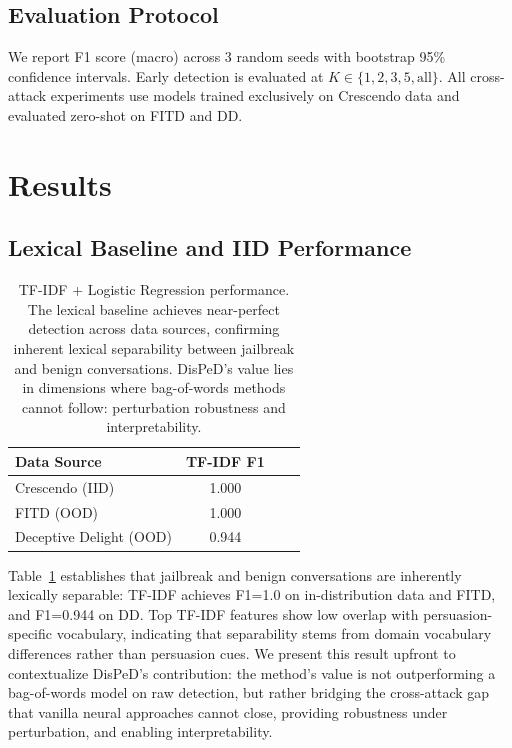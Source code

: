 \documentclass[11pt,a4paper]{article}
\newcommand{\ours}{DisPeD}
\begin{document}
\subsection{Evaluation Protocol}

We report F1 score (macro) across 3 random seeds with bootstrap 95\% confidence intervals. Early detection is evaluated at $K \in \{1, 2, 3, 5, \text{all}\}$. All cross-attack experiments use models trained exclusively on Crescendo data and evaluated zero-shot on FITD and DD.


\section{Results}

\subsection{Lexical Baseline and IID Performance}

\begin{table}[t]
\centering
\small
\begin{tabular}{lccc}
\toprule
\textbf{Data Source} & \textbf{TF-IDF F1} \\
\midrule
Crescendo (IID) & 1.000 \\
FITD (OOD) & 1.000 \\
Deceptive Delight (OOD) & 0.944 \\
\bottomrule
\end{tabular}
\caption{TF-IDF + Logistic Regression performance. The lexical baseline achieves near-perfect detection across data sources, confirming inherent lexical separability between jailbreak and benign conversations. \ours{}'s value lies in dimensions where bag-of-words methods cannot follow: perturbation robustness and interpretability.}
\label{tab:tfidf}
\end{table}

Table~\ref{tab:tfidf} establishes that jailbreak and benign conversations are inherently lexically separable: TF-IDF achieves F1=1.0 on in-distribution data and FITD, and F1=0.944 on DD. Top TF-IDF features show low overlap with persuasion-specific vocabulary, indicating that separability stems from domain vocabulary differences rather than persuasion cues. We present this result upfront to contextualize \ours{}'s contribution: the method's value is not outperforming a bag-of-words model on raw detection, but rather bridging the cross-attack gap that vanilla neural approaches cannot close, providing robustness under perturbation, and enabling interpretability.
\end{document}
